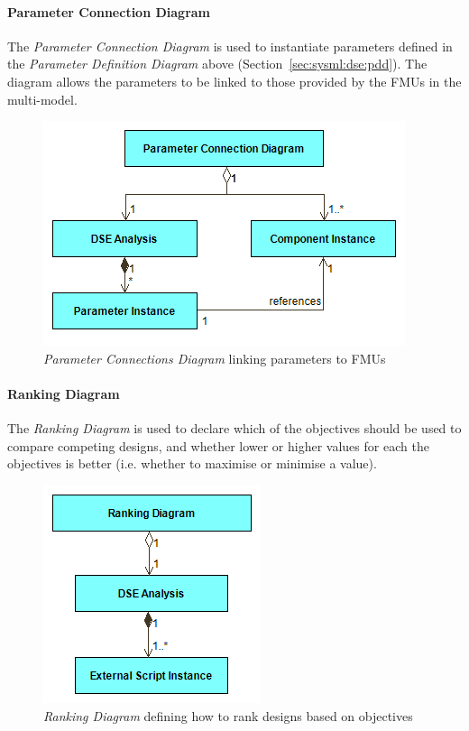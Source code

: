 \paragraph{Parameter Connection Diagram}
\label{sec:sysml:dse:pcd}

The \emph{Parameter Connection Diagram} is used to instantiate parameters defined in the \emph{Parameter Definition Diagram} above (Section~\ref{sec:sysml:dse:pdd}). The diagram allows the parameters to be linked to those provided by the FMUs in the multi-model.

\begin{figure}[h!]
\centering
\includegraphics[scale=0.5]{figures/DSE/ParameterConnectionsView}
\caption{\emph{Parameter Connections Diagram} linking parameters to FMUs}
\label{fig:sysml:sysml:dse:pcd}
\end{figure}

\paragraph{Ranking Diagram}
\label{sec:sysml:dse:rd}

The \emph{Ranking Diagram} is used to declare which of the objectives should be used to compare competing designs, and whether lower or higher values for each the objectives is better (i.e. whether to maximise or minimise a value).

\begin{figure}[h!]
\centering
\includegraphics[scale=0.5]{figures/DSE/RankingView}
\caption{\emph{Ranking Diagram} defining how to rank designs based on objectives}
\label{fig:sysml:sysml:dse:rd}
\end{figure}


